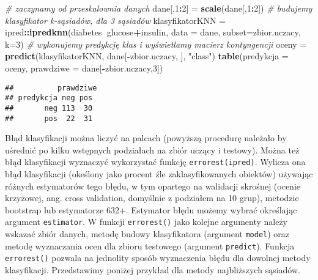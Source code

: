 \documentclass[polish,]{book}
\newenvironment{Shaded}{\begin{snugshade}}{\end{snugshade}}
\newcommand{\CommentTok}[1]{\textcolor[rgb]{0.56,0.35,0.01}{\textit{#1}}}
\newcommand{\DataTypeTok}[1]{\textcolor[rgb]{0.13,0.29,0.53}{#1}}
\newcommand{\DecValTok}[1]{\textcolor[rgb]{0.00,0.00,0.81}{#1}}
\newcommand{\KeywordTok}[1]{\textcolor[rgb]{0.13,0.29,0.53}{\textbf{#1}}}
\newcommand{\NormalTok}[1]{#1}
\newcommand{\OperatorTok}[1]{\textcolor[rgb]{0.81,0.36,0.00}{\textbf{#1}}}
\newcommand{\StringTok}[1]{\textcolor[rgb]{0.31,0.60,0.02}{#1}}
\begin{document}
\begin{Shaded}
\begin{Highlighting}[]
\CommentTok{# zaczynamy od przeskalownia danych}
\NormalTok{dane[,}\DecValTok{1}\OperatorTok{:}\DecValTok{2}\NormalTok{] =}\StringTok{ }\KeywordTok{scale}\NormalTok{(dane[,}\DecValTok{1}\OperatorTok{:}\DecValTok{2}\NormalTok{])}
\CommentTok{# budujemy klasyfikator k-sąsiadów, dla 3 sąsiadów}
\NormalTok{klasyfikatorKNN =}\StringTok{ }\NormalTok{ipred}\OperatorTok{::}\KeywordTok{ipredknn}\NormalTok{(diabetes}\OperatorTok{~}\NormalTok{glucose}\OperatorTok{+}\NormalTok{insulin, }
                                  \DataTypeTok{data =}\NormalTok{ dane, }\DataTypeTok{subset=}\NormalTok{zbior.uczacy, }\DataTypeTok{k=}\DecValTok{3}\NormalTok{)}
\CommentTok{# wykonujemy predykcję klas i wyświetlamy macierz kontyngencji}
\NormalTok{oceny =}\StringTok{ }\KeywordTok{predict}\NormalTok{(klasyfikatorKNN, dane[}\OperatorTok{-}\NormalTok{zbior.uczacy, ], }\StringTok{"class"}\NormalTok{)}
\KeywordTok{table}\NormalTok{(}\DataTypeTok{predykcja =}\NormalTok{ oceny, }\DataTypeTok{prawdziwe =}\NormalTok{ dane[}\OperatorTok{-}\NormalTok{zbior.uczacy,}\DecValTok{3}\NormalTok{])}
\end{Highlighting}
\end{Shaded}

\begin{verbatim}
##          prawdziwe
## predykcja neg pos
##       neg 113  30
##       pos  22  31
\end{verbatim}

Błąd klasyfikacji można liczyć na palcach (powyższą procedurę należało by uśrednić po kilku wstępnych podziałach na zbiór uczący i testowy). Można też błąd klasyfikacji wyznaczyć wykorzystać funkcję \texttt{errorest(ipred)}. Wylicza ona błąd klasyfikacji (okeślony jako procent źle zaklasyfikowanych obiektów) używając różnych
estymatorów tego błędu, w tym opartego na walidacji skrośnej (ocenie krzyżowej,
ang. cross validation, domyślnie z podziałem na 10 grup), metodzie bootstrap lub estymatorze 632+. Estymator błędu możemy wybrać określając argument \texttt{estimator}.
W funkcji \texttt{errorest()} jako kolejne argumenty należy wskazać zbiór danych, metodę
budowy klasyfikatora (argument \texttt{model}) oraz metodę wyznaczania ocen dla zbioru
testowego (argument \texttt{predict}). Funkcja \texttt{errorest()} pozwala na jednolity sposób
wyznaczenia błędu dla dowolnej metody klasyfikacji. Przedstawimy poniżej przykład
dla metody najbliższych sąsiadów.
\end{document}
